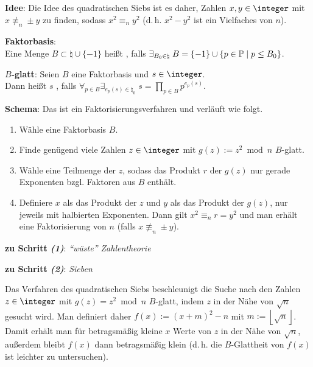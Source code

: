 \textbf{Idee}:
Die Idee des quadratischen Siebs ist es daher, Zahlen $x, y \in \integer$ mit
$x \not\equiv_n \pm y$ zu finden, sodass $x^2 \equiv_n y^2$
(d.\,h. $x^2 - y^2$ ist ein Vielfaches von $n$).

\textbf{Faktorbasis}:\\
Eine Menge $B \subset \natural \cup \{-1\}$ heißt , falls
$\exists_{B_0 \in \natural}\; B = \{-1\} \cup \{p \in \mathbb{P} \;|\; p \le B_0\}$.

\textbf{$B$-glatt}:
Seien $B$ eine Faktorbasis und $s \in \integer$.\\
Dann heißt $s$ , falls $\forall_{p \in B} \exists_{e_p(s) \in \natural_0}\;
s = \prod_{p \in B} p^{e_p(s)}$.

\textbf{Schema}:
Das  ist ein Faktorisierungsverfahren und verläuft wie folgt.
\begin{enumerate}
    \item
    Wähle eine Faktorbasis $B$.
    
    \item
    Finde genügend viele Zahlen $z \in \integer$ mit $g(z) := z^2 \bmod n$ $B$-glatt.
    
    \item
    Wähle eine Teilmenge der $z$, sodass das Produkt $r$ der $g(z)$ nur gerade Exponenten bzgl.
    Faktoren aus $B$ enthält.
    
    \item
    Definiere $x$ als das Produkt der $z$ und
    $y$ als das Produkt der $g(z)$, nur jeweils mit halbierten Exponenten.
    Dann gilt $x^2 \equiv_n r = y^2$ und man erhält eine Faktorisierung von $n$
    (falls $x \not\equiv_n \pm y$).
\end{enumerate}

\linie

\textbf{zu Schritt \emph{(1)}}:
\emph{"`wüste"' Zahlentheorie}

\linie

\textbf{zu Schritt \emph{(2)}}:
\emph{Sieben}

Das Verfahren des quadratischen Siebs beschleunigt die Suche nach den Zahlen $z \in \integer$ mit
$g(z) = z^2 \bmod n$ $B$-glatt, indem $z$ in der Nähe von $\sqrt{n}$ gesucht wird.
Man definiert daher $f(x) := (x + m)^2 - n$ mit $m := \left\lfloor\sqrt{n}\right\rfloor$.
Damit erhält man für betragsmäßig kleine $x$ Werte von $z$ in der Nähe von $\sqrt{n}$,
außerdem bleibt $f(x)$ dann betragsmäßig klein
(d.\,h. die $B$-Glattheit von $f(x)$ ist leichter zu untersuchen).

